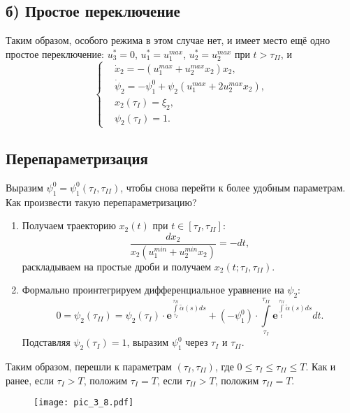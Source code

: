 \subsection*{б) Простое переключение}
Таким образом, особого режима в этом случае нет, и имеет место ещё одно простое переключение: $u_3^* = 0$, $u_1^* = u_1^{max}$, $u_2^* = u_2^{max}$ при $t > \tau_{II}$, и
$$
    \left\{
        \begin{aligned}
            & \dot{x}_2 = - (u_1^{max} + u_2^{max} x_2) x_2, \\
            & \dot{\psi}_2 = -\psi_1^0 + \psi_2 (u_1^{max} + 2 u_2^{max} x_2), \\
            & x_2(\tau_{I}) = \xi_2, \\
            & \psi_2 (\tau_{I}) = 1.
        \end{aligned}
    \right.
$$

\subsection*{Перепараметризация}
Выразим $\psi_1^0 = \psi_1^0(\tau_{I}, \tau_{II})$, чтобы снова перейти к более удобным параметрам. Как произвести такую перепараметризацию?

\begin{enumerate}
    \item Получаем траекторию $x_2(t)$ при $t \in [\tau_{I}, \tau_{II}]$:
    $$
        \frac{dx_2}{x_2(u_1^{min} + u_2^{min} x_2)} = -dt,
    $$
    раскладываем на простые дроби и получаем $x_2(t; \tau_I, \tau_{II})$.
    \item Формально проинтегрируем дифференциальное уравнение на $\psi_2$:
    $$
        0 = \psi_2(\tau_{II}) = \psi_2(\tau_{I}) \cdot \mathbf{e}^{\int\limits_{\tau_I}^{\tau_{II}} \tilde{\alpha}(s) ds} + (-\psi_1^0) \cdot \int\limits_{\tau_{I}}^{\tau_{II}} \mathbf{e}^{\int\limits_{t}^{\tau_{II}} \tilde{\alpha}(s) ds} dt.
    $$
    Подставляя $\psi_2(\tau_I) = 1$, выразим $\psi_1^0$ через $\tau_I$ и $\tau_{II}$.
\end{enumerate}

Таким образом, перешли к параметрам $(\tau_{I}, \tau_{II})$, где $0 \leqslant \tau_{I} \leqslant \tau_{II} \leqslant T$. Как и ранее, если $\tau_{I} > T$, положим $\tau_{I} = T$, если $\tau_{II} > T$, положим $\tau_{II} = T$.

\begin{figure}[H]
    \centering
    \texttt{[image: pic\_3\_8.pdf]}
\end{figure}

